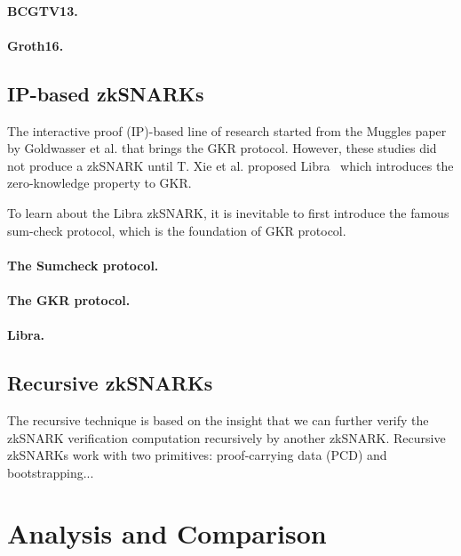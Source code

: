 \documentclass[acmtog]{acmart}
\begin{document}
\paragraph{BCGTV13.}

\paragraph{Groth16.}

\subsection{IP-based zkSNARKs}
\label{sec:ip.based}

The interactive proof (IP)-based line of research started from the Muggles paper~\cite{GoldwasserKR08} by Goldwasser et al. that brings the GKR protocol.
However, these studies did not produce a zkSNARK until T. Xie et al. proposed Libra~\cite{XieZZPS19} which introduces the zero-knowledge property to GKR.

To learn about the Libra zkSNARK, it is inevitable to first introduce the famous sum-check protocol, which is the foundation of GKR protocol.

\paragraph{The Sumcheck protocol.}

\paragraph{The GKR protocol.}

\paragraph{Libra.}

\subsection{Recursive zkSNARKs}
\label{sec:recursive}

The recursive technique is based on the insight that we can further verify the zkSNARK verification computation recursively by another zkSNARK.
Recursive zkSNARKs work with two primitives: proof-carrying data (PCD) and bootstrapping...

\section{Analysis and Comparison}
\label{sec:analysis}
\end{document}
